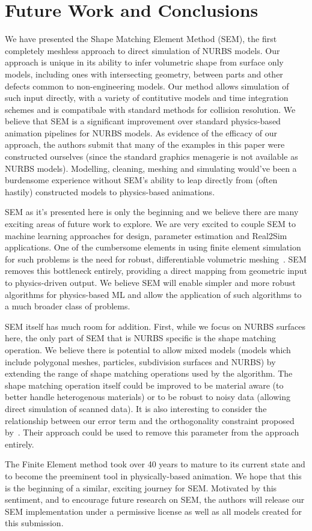 \section{Future Work and Conclusions}
We have presented the Shape Matching Element Method (SEM), the first completely meshless approach to direct simulation of NURBS models.
Our approach is unique in its ability to infer volumetric shape from surface only models,
including ones with intersecting geometry, between parts and other defects common to non-engineering models.
Our method allows simulation of such input directly, with a variety of contitutive models and time integration schemes
and is compatibale with standard methods for collision resolution. 
We believe that SEM is a significant improvement over standard physics-based animation pipelines for NURBS models. 
As evidence of the efficacy of our approach, the authors submit that many of the examples in this paper were constructed ourselves
(since the standard graphics menagerie is not available as NURBS models). 
Modelling, cleaning, meshing and simulating would've been a burdensome experience without SEM's
ability to leap directly from (often hastily) constructed models to physics-based animations.

SEM as it's presented here is only the beginning and we believe there are many exciting areas of future work to explore.
We are very excited to couple SEM to machine learning approaches for design, parameter estimation and Real2Sim applications.
One of the cumbersome elements in using finite element simulation for such problems is the need for robust, differentiable volumetric meshing~\cite{gao2020deftet}.
SEM removes this bottleneck entirely, providing a direct mapping from geometric input to physics-driven output. 
We believe SEM will enable simpler and more robust algorithms for  physics-based ML and 
allow the application of such algorithms to a much broader class of problems. 

SEM itself has much room for addition.
First, while we focus on NURBS surfaces here, the only part of SEM that is NURBS specific is the shape matching operation.
We believe there is potential to allow mixed models (models which include polygonal meshes, particles, subdivision surfaces and NURBS)
by extending the range of shape matching operations used by the algorithm. The shape matching operation itself could be improved to be material aware 
(to better handle heterogenous materials) or to be robust to noisy data (allowing direct simulation of scanned data). 
It is also interesting to consider the relationship between our error term and the orthogonality constraint proposed by~\citet{Zhang:CompDynamics:2020}. 
Their approach could be used to remove this parameter from the approach entirely.

The Finite Element method took over  40 years to mature to its current state and to become the preeminent tool in physically-based animation.
We hope that this is the beginning of a similar, exciting journey for SEM. 
Motivated by this sentiment, and to encourage future research on SEM, the authors will release our SEM implementation 
under a permissive license as well as all models created for this submission.
